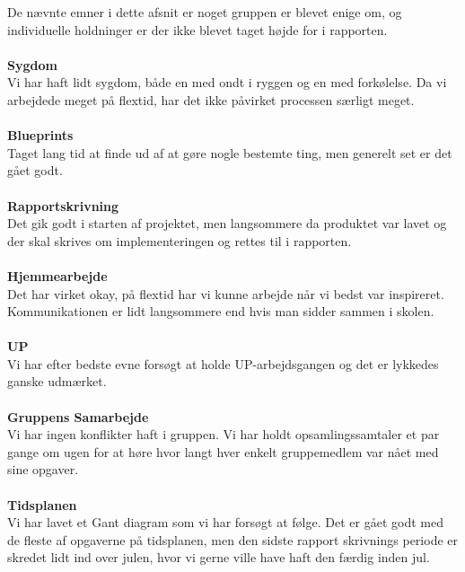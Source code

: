 De nævnte emner i dette afsnit er noget gruppen er blevet enige om, og individuelle holdninger er der ikke blevet taget højde for i rapporten.\\
\\
\textbf{Sygdom}\\
Vi har haft lidt sygdom, både en med ondt i ryggen og en med forkølelse. Da vi arbejdede meget på flextid, har det ikke påvirket processen særligt meget.\\
\\
\textbf{Blueprints}\\
Taget lang tid at finde ud af at gøre nogle bestemte ting, men generelt set er det gået godt.\\
\\
\textbf{Rapportskrivning}\\
Det gik godt i starten af projektet, men langsommere da produktet var lavet og der skal skrives om implementeringen og rettes til i rapporten.\\
\\
\textbf{Hjemmearbejde}\\
Det har virket okay, på flextid har vi kunne arbejde når vi bedst var inspireret. Kommunikationen er lidt langsommere end hvis man sidder sammen i skolen.\\
\\
\textbf{UP}\\
Vi har efter bedste evne forsøgt at holde UP-arbejdsgangen og det er lykkedes ganske udmærket.\\
\\
\textbf{Gruppens Samarbejde}\\
Vi har ingen konflikter haft i gruppen. Vi har holdt opsamlingssamtaler et par gange om ugen for at høre hvor langt hver enkelt gruppemedlem var nået med sine opgaver.\\
\\
\textbf{Tidsplanen}\\
Vi har lavet et Gant diagram som vi har forsøgt at følge. Det er gået godt med de fleste af opgaverne på tidsplanen, men den sidste rapport skrivnings periode er skredet lidt ind over julen, hvor vi gerne ville have haft den færdig inden jul.\\
